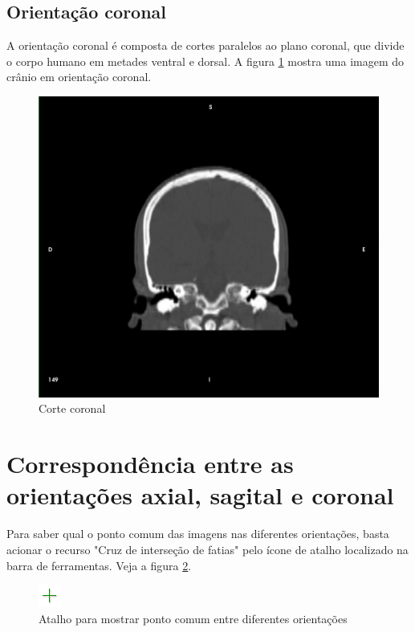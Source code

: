 \newpage

\subsection{Orientação coronal}

A orientação coronal é composta de cortes paralelos ao plano coronal,
que divide o corpo humano em metades ventral e dorsal.
A figura \ref{fig:coronal_slice} mostra uma imagem do crânio em orientação
coronal.

\begin{figure}[!htb]
\centering
\includegraphics[scale=0.15]{../user_guide_figures/invesalius_screen/coronal.jpg}
\caption{Corte coronal}
\label{fig:coronal_slice}
\end{figure}


\section{Correspondência entre as orientações axial, sagital e coronal}
\label{sec:corresp_all_orient}

Para saber qual o ponto comum das imagens nas diferentes orientações, basta acionar o
recurso "Cruz de interseção de fatias" pelo ícone de atalho localizado na barra de ferramentas.
Veja a figura \ref{fig:cross_icon}.

\begin{figure}[!htb]
\centering
\includegraphics[scale=1]{../user_guide_figures/icons/cross.png}
\caption{Atalho para mostrar ponto comum entre diferentes orientações}
\label{fig:cross_icon}
\end{figure}

